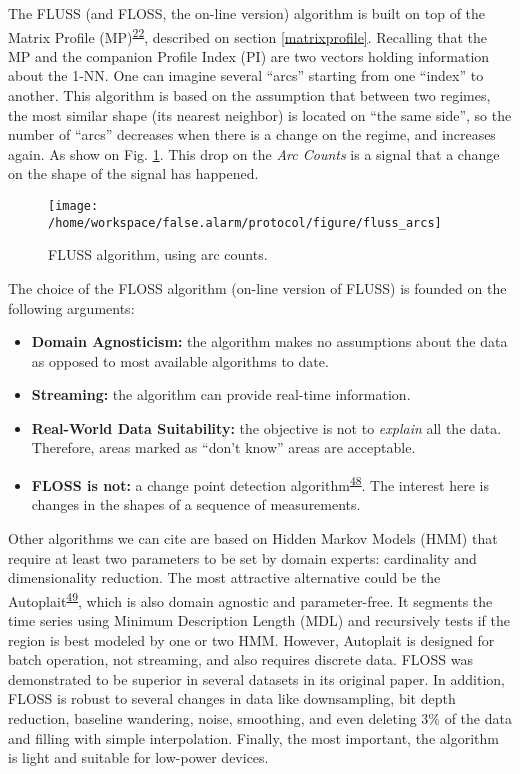 \documentclass[12pt,twoside]{fmupthesis}
\providecommand{\tightlist}{%
  \setlength{\itemsep}{0pt}\setlength{\parskip}{0pt}}
\begin{document}
The FLUSS (and FLOSS, the on-line version) algorithm is built on top of the Matrix Profile
(MP)\textsuperscript{\protect\hyperlink{ref-Yeh2017a}{22}}, described on section \ref{matrixprofile}. Recalling that the MP and the companion
Profile Index (PI) are two vectors holding information about the 1-NN. One can imagine several
``arcs'' starting from one ``index'' to another. This algorithm is based on the assumption that between
two regimes, the most similar shape (its nearest neighbor) is located on ``the same side'', so the
number of ``arcs'' decreases when there is a change on the regime, and increases again. As show on
Fig. \ref{fig:arcsoriginal}. This drop on the \emph{Arc Counts} is a signal that a change on the shape
of the signal has happened.
\begin{figure}

{\centering \texttt{[image: /home/workspace/false.alarm/protocol/figure/fluss\_arcs]} 

}

\caption{FLUSS algorithm, using arc counts.}\label{fig:arcsoriginal}
\end{figure}
The choice of the FLOSS algorithm (on-line version of FLUSS) is founded on the following arguments:
\begin{itemize}
\tightlist
\item
  \textbf{Domain Agnosticism:} the algorithm makes no assumptions about the data as opposed to most
  available algorithms to date.
\item
  \textbf{Streaming:} the algorithm can provide real-time information.
\item
  \textbf{Real-World Data Suitability:} the objective is not to \emph{explain} all the data. Therefore, areas
  marked as ``don't know'' areas are acceptable.
\item
  \textbf{FLOSS is not:} a change point detection algorithm\textsuperscript{\protect\hyperlink{ref-aminikhanghahi2016}{48}}. The interest here is
  changes in the shapes of a sequence of measurements.
\end{itemize}
Other algorithms we can cite are based on Hidden Markov Models (HMM) that require at least two
parameters to be set by domain experts: cardinality and dimensionality reduction. The most
attractive alternative could be the Autoplait\textsuperscript{\protect\hyperlink{ref-Matsubara2014}{49}}, which is also domain agnostic and
parameter-free. It segments the time series using Minimum Description Length (MDL) and recursively
tests if the region is best modeled by one or two HMM. However, Autoplait is designed for batch
operation, not streaming, and also requires discrete data. FLOSS was demonstrated to be superior in
several datasets in its original paper. In addition, FLOSS is robust to several changes in data like
downsampling, bit depth reduction, baseline wandering, noise, smoothing, and even deleting 3\% of the
data and filling with simple interpolation. Finally, the most important, the algorithm is light and
suitable for low-power devices.
\end{document}
